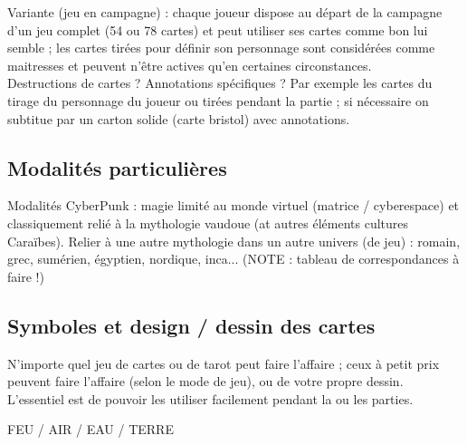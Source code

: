 \documentclass[11pt,twoside,a4paper]{article}
\begin{document}
Variante (jeu en campagne) : chaque joueur dispose au d{\'e}part de la campagne d'un jeu complet (54 ou 78 cartes) et peut utiliser ses cartes comme bon lui semble ; les cartes tir{\'e}es pour d{\'e}finir son personnage sont consid{\'e}r{\'e}es comme maitresses et peuvent n'{\^e}tre actives qu'en certaines circonstances.~\\

Destructions de cartes ? Annotations sp{\'e}cifiques ? Par exemple les cartes du tirage du personnage du joueur ou tir{\'e}es pendant la partie ; si n{\'e}cessaire on subtitue par un carton solide (carte bristol) avec annotations.~\\

\subsection{Modalit{\'e}s particuli{\`e}res}

Modalit{\'e}s CyberPunk : magie limit{\'e} au monde virtuel (matrice / cyberespace) et classiquement reli{\'e} {\`a} la mythologie vaudoue (at autres {\'e}l{\'e}ments cultures Cara{\"i}bes). 
Relier {\`a} une autre mythologie dans un autre univers (de jeu) : romain, grec, sum{\'e}rien, {\'e}gyptien, nordique, inca... (NOTE : tableau de correspondances {\`a} faire !)

\subsection{Symboles et design / dessin des cartes}

N'importe quel jeu de cartes ou de tarot peut faire l'affaire ; ceux à petit prix peuvent faire l'affaire (selon le mode de jeu), ou de votre propre dessin. L'essentiel est de pouvoir les utiliser facilement pendant la ou les parties.~\\

\begin{minipage}[ht]{0.45\textwidth}
	FEU / AIR / EAU / TERRE
\end{minipage} \hfill \begin{minipage}[ht]{0.45\textwidth}
	\def\triangle{--++(120:1)--++(240:1)--cycle}
	\def\triangleReverse{--++(240:1)--cycle}
\end{minipage}
\end{document}
